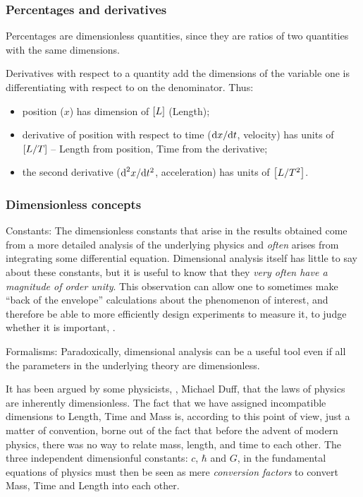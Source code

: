 \subsubsection{Percentages and derivatives}
Percentages are dimensionless quantities, since they are ratios of two quantities with the same dimensions.

Derivatives with respect to a quantity add the dimensions of the variable one is differentiating with respect to on the denominator. Thus:
\begin{itemize}
\item position ($x$) has dimension of $\left[{L}\right]$ (Length);
\item derivative of position with respect to time ($\text{d} x/\text{d} t$, velocity) has units of $\left[{L/T}\right]$ -- Length from position, Time from the derivative;
\item the second derivative ($\text{d}^2 x/\text{d} t^2$, acceleration) has units of $\left[{L/T^2}\right]$.
\end{itemize}


\subsubsection{Dimensionless concepts}
Constants: The dimensionless constants that arise in the results obtained come from a more detailed analysis of the underlying physics and \emph{often} arises from integrating some differential equation. Dimensional analysis itself has little to say about these constants, but it is useful to know that they \emph{very often have a magnitude of order unity}. This observation can allow one to sometimes make ``back of the envelope'' calculations about the phenomenon of interest, and therefore be able to more efficiently design experiments to measure it, to judge whether it is important, \etc.

Formalisms: Paradoxically, dimensional analysis can be a useful tool even if all the parameters in the underlying theory are dimensionless.

It has been argued by some physicists, \eg, Michael Duff, that the laws of physics are inherently dimensionless. The fact that we have assigned incompatible dimensions to Length, Time and Mass is, according to this point of view, just a matter of convention, borne out of the fact that before the advent of modern physics, there was no way to relate mass, length, and time to each other. The three independent dimensionful constants: $c$, $\hbar$ and $G$, in the fundamental equations of physics must then be seen as mere \emph{conversion factors} to convert Mass, Time and Length into each other.

